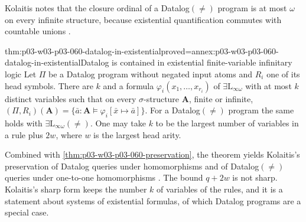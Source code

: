 Kolaitis notes that the closure ordinal of a Datalog\((\neq)\) program is
at most \(\omega\) on every infinite structure, because existential
quantification commutes with countable unions
\cite[p.~46]{Kolaitis2003ExpressivePowerNotes}.

\begin{hbtheorem}{thm:p03-w03-p03-060-datalog-in-existential}{proved=annex:p03-w03-p03-060-datalog-in-existential}{Datalog is contained in existential finite-variable infinitary logic}
Let \(\Pi\) be a Datalog program without negated input atoms and \(R_i\)
one of its head symbols. There are \(k\) and a formula
\(\varphi_i(x_1,\ldots,x_{r_i})\) of \(\exists\mathrm{L}_{\infty\omega}\)
with at most \(k\) distinct variables such that on every
\(\sigma\)-structure \(\mathbf A\), finite or infinite,
\((\Pi,R_i)(\mathbf A)=\{\bar a:\mathbf A\models\varphi_i[\bar x\mapsto\bar a]\}\).
For a Datalog\((\neq)\) program the same holds with
\(\exists\mathrm{L}_{\infty\omega}(\neq)\). One may take \(k\) to be the
largest number of variables in a rule plus \(2w\), where \(w\) is the
largest head arity.
\end{hbtheorem}

Combined with \cref{thm:p03-w03-p03-060-preservation}, the theorem yields
Kolaitis's preservation of Datalog queries under homomorphisms and of
Datalog\((\neq)\) queries under one-to-one homomorphisms
\cite[Props.~6.23 and~6.26, pp.~44--45]{Kolaitis2003ExpressivePowerNotes}.
The bound \(q+2w\) is not sharp. Kolaitis's sharp form keeps the number
\(k\) of variables of the rules, and it is a statement about systems of
existential formulas, of which Datalog programs are a special case.

